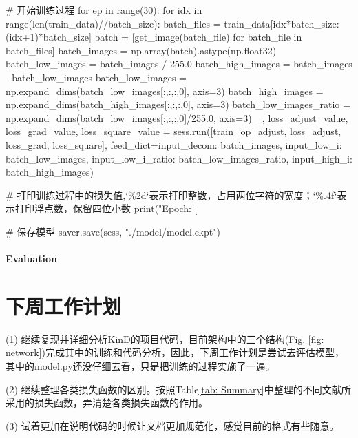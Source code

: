 \documentclass[letterpaper,12pt]{article}
\begin{document}
			\begin{python}
			# 开始训练过程
			for ep in range(30):
				for idx in range(len(train_data)//batch_size):
					batch_files = train_data[idx*batch_size:(idx+1)*batch_size]
					batch = [get_image(batch_file) for batch_file in batch_files]
					batch_images = np.array(batch).astype(np.float32)
					batch_low_images = batch_images / 255.0
					batch_high_images = batch_images - batch_low_images
					batch_low_images = np.expand_dims(batch_low_images[:,:,:,0], axis=3)
					batch_high_images = np.expand_dims(batch_high_images[:,:,:,0], axis=3)
					batch_low_images_ratio = np.expand_dims(batch_low_images[:,:,:,0]/255.0, axis=3)
					_, loss_adjust_value, loss_grad_value, loss_square_value = sess.run([train_op_adjust, loss_adjust, loss_grad, loss_square], feed_dict={input_decom: batch_images, input_low_i: batch_low_images, input_low_i_ratio: batch_low_images_ratio, input_high_i: batch_high_images})
					
			# 打印训练过程中的损失值,`\%2d`表示打印整数，占用两位字符的宽度；`\%.4f`表示打印浮点数，保留四位小数		
			print("Epoch: [%
			
			# 保存模型
			saver.save(sess, "./model/model.ckpt")
			\end{python}
			
		\paragraph{Evaluation}
		
			
			
	
	
	\section{下周工作计划}
	
	(1) 继续复现并详细分析KinD的项目代码，目前架构中的三个结构(Fig. \ref{fig: network})完成其中的训练和代码分析，因此，下周工作计划是尝试去评估模型，其中的model.py还没仔细去看，只是把训练的过程实施了一遍。
	
	(2) 继续整理各类损失函数的区别。按照Table\ref{tab: Summary}中整理的不同文献所采用的损失函数，弄清楚各类损失函数的作用。
	
	(3) 试着更加在说明代码的时候让文档更加规范化，感觉目前的格式有些随意。
	
\end{document}
